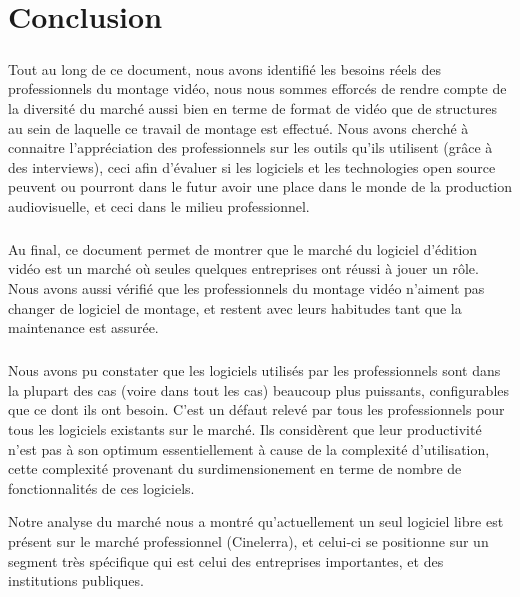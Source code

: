 \newpage \chapter*{Conclusion}

\paragraph{}

Tout au long de ce document, nous avons identifié les besoins réels
des professionnels du montage vidéo, nous nous sommes efforcés de
rendre compte de la diversité du marché aussi bien en terme de format
de vidéo que de structures au sein de laquelle ce travail de montage
est effectué. Nous avons  cherché à connaitre l'appréciation des
professionnels sur les outils qu'ils utilisent (grâce à des interviews),
ceci afin d'évaluer si les logiciels et les technologies open source
peuvent ou pourront dans le futur avoir une place dans le monde de la
production audiovisuelle, et ceci dans le milieu professionnel.

\paragraph{}

Au final, ce document permet de montrer que le marché du logiciel
d'édition vidéo est un marché où seules quelques entreprises
ont réussi à jouer un rôle. Nous avons aussi vérifié que les
professionnels du montage vidéo n'aiment pas changer de logiciel de
montage, et restent avec leurs habitudes tant que la maintenance est
assurée.

\paragraph{}

Nous avons pu constater que les logiciels utilisés par les professionnels
sont dans la plupart des cas (voire dans tout les cas) beaucoup plus
puissants, configurables que ce dont ils ont besoin. C'est un défaut
relevé par tous les professionnels pour tous les logiciels existants
sur le marché. Ils considèrent que leur productivité n'est pas à
son optimum essentiellement à cause de la complexité d'utilisation,
cette complexité provenant du surdimensionement en terme de nombre de
fonctionnalités de ces logiciels.

Notre analyse du marché nous a montré qu'actuellement un seul
logiciel libre est présent sur le marché professionnel (Cinelerra),
et celui-ci se positionne sur un segment très spécifique qui est celui
des entreprises importantes, et des institutions publiques.


